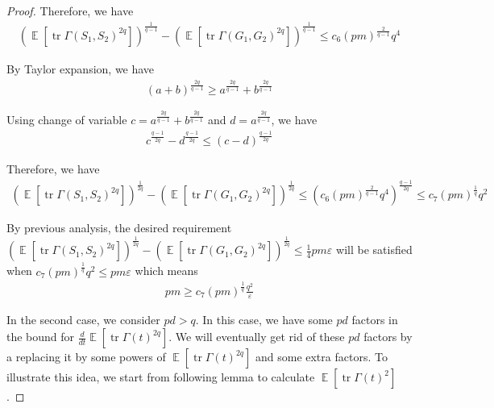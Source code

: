 \documentclass[11pt]{amsart}
\numberwithin{equation}{section}
\numberwithin{equation}{section}
\DeclareMathOperator{\E}{\mathbb{E}}
\DeclareMathOperator*{\tr}{tr}
\theoremstyle{remark}
\theoremstyle{definition}
\begin{document}
\begin{proof}
Therefore, we have
\begin{align*}
    (\E[\tr \Gamma(S_1,S_2)^{2q}])^{\frac{1}{q-1}}-(\E[\tr \Gamma(G_1,G_2)^{2q}])^{\frac{1}{q-1}} \le c_6 (pm)^{\frac{2}{q-1}} q^4
\end{align*}

By Taylor expansion, we have
\begin{align*}
    (a+b)^{\frac{2q}{q-1}} \ge a^{\frac{2q}{q-1}}+b^{\frac{2q}{q-1}}
\end{align*}

Using change of variable $c=a^{\frac{2q}{q-1}}+b^{\frac{2q}{q-1}}$ and $d=a^{\frac{2q}{q-1}}$, we have
\begin{align*}
    c^{\frac{q-1}{2q}}-d^{\frac{q-1}{2q}} \le (c-d)^{\frac{q-1}{2q}}
\end{align*}

Therefore, we have
\begin{align*}
    (\E[\tr \Gamma(S_1,S_2)^{2q}])^{\frac{1}{2q}}-(\E[\tr \Gamma(G_1,G_2)^{2q}])^{\frac{1}{2q}} \le (c_6 (pm)^{\frac{2}{q-1}} q^4)^{\frac{q-1}{2q}} \le c_7 (pm)^{\frac{1}{q}} q^2
\end{align*}

By previous analysis, the desired requirement $(\E[\tr \Gamma(S_1,S_2)^{2q}])^{\frac{1}{2q}}-(\E[\tr \Gamma(G_1,G_2)^{2q}])^{\frac{1}{2q}} \le \frac{1}{4} pm \varepsilon$ will be satisfied when
$c_7 (pm)^{\frac{1}{q}}  q^2 \le pm \varepsilon$
which means
\begin{align*}
    pm \ge c_7 (pm)^{\frac{1}{q}}  \frac{q^2}{\varepsilon}
\end{align*}

In the second case, we consider $pd>q$. In this case, we have some $pd$ factors in the bound for $\frac{d}{dt} \E[\tr \Gamma(t)^{2q}]$. We will eventually get rid of these $pd$ factors by a replacing it by some powers of $\E[\tr \Gamma(t)^{2q}]$ and some extra factors. To illustrate this idea, we start from following lemma to calculate $\E [\tr \Gamma(t)^2]$.


\end{proof}
\end{document}

